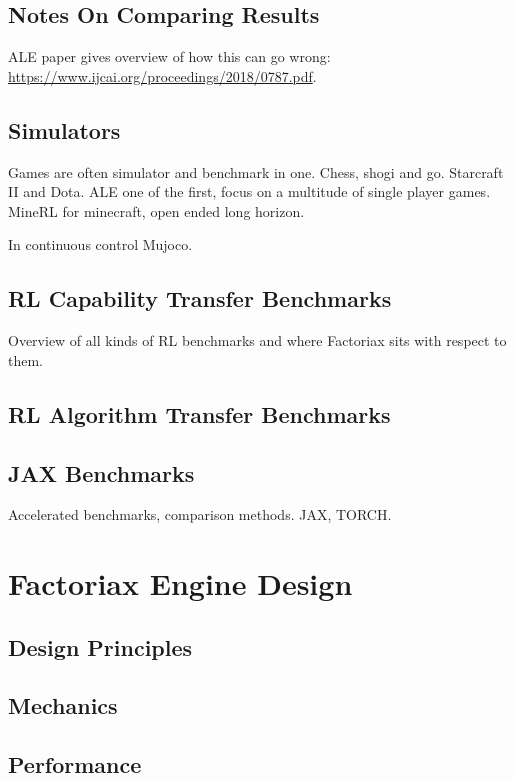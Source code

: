 \documentclass{article}
\begin{document}
\subsection{Notes On Comparing Results}
ALE paper gives overview of how this can go wrong: \url{https://www.ijcai.org/proceedings/2018/0787.pdf}.

\subsection{Simulators}
Games are often simulator and benchmark in one.
Chess, shogi and go.
Starcraft II and Dota. 
ALE one of the first, focus on a multitude of single player games. 
MineRL for minecraft, open ended long horizon.


In continuous control Mujoco.




\subsection{RL Capability Transfer Benchmarks}
Overview of all kinds of RL benchmarks and where Factoriax sits with respect to them. 


\subsection{RL Algorithm Transfer Benchmarks}

\subsection{JAX Benchmarks}
Accelerated benchmarks, comparison methods. JAX, TORCH. 


\section{Factoriax Engine Design}


\subsection{Design Principles}

\subsection{Mechanics}

\subsection{Performance}
\end{document}
